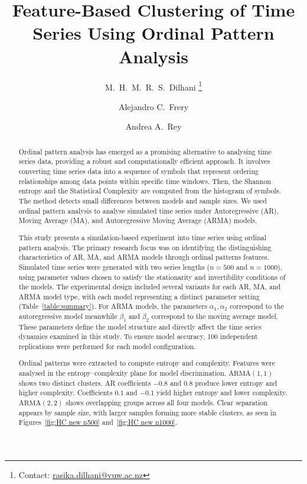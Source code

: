 \documentclass[11pt,a4paper]{article}
\title{\vspace{-1cm}Feature-Based Clustering of Time Series Using Ordinal Pattern Analysis\vspace{-0.3cm}}
\author[1]{M.\ H.\ M.\ R.\ S.\ Dilhani \thanks{Contact: \href{mailto:rasika.dilhani@vuw.ac.nz}{rasika.dilhani@vuw.ac.nz}}}
\author[1]{Alejandro C.\ Frery}
\author[2]{Andrea A.\ Rey}
\affil[1]{School of Mathematics and Statistics, Victoria University of Wellington, New Zealand}
\affil[2]{Laboratorio de Investigación y Desarrollo Experimental en Computación (LIDEC), Universidad Nacional de Hurlingham (UNAHUR), Argentina}
\date{}
\begin{document}
	\maketitle
	\vspace{-0.5cm}
	
	\begin{abstract}
	
	
Ordinal pattern analysis has emerged as a promising alternative to analysing time series data, providing a robust and computationally efficient approach. 
It involves converting time series data into a sequence of symbols that represent ordering relationships among data points within specific time windows.  
Then, the Shannon entropy and the Statistical Complexity are computed from the histogram of symbols. 
The method detects small differences between models and sample sizes.
We used ordinal pattern analysis to analyse simulated time series under Autoregressive (AR), Moving Average (MA), and Autoregressive Moving Average (ARMA) models. 
	
This study presents a simulation-based experiment into time series using ordinal pattern analysis. 
The primary research focus was on identifying the distinguishing characteristics of AR, MA, and ARMA models through ordinal patterns features. 
Simulated time series were generated with two series lengths ($n = 500$ and $n = 1000$), using parameter values chosen to satisfy the stationarity and invertibility conditions of the models. 
The experimental design included several variants for each AR, MA, and ARMA model type, with each model representing a distinct parameter setting (Table~\ref{table:summary}). 
For ARMA models, the parameters $\alpha_1, \alpha_2$ correspond to the autoregressive model meanwhile $\beta_1$ and $\beta_2$ correspond to the moving average model.
These parameters define the model structure and directly affect the time series dynamics examined in this study. 
To ensure model accuracy, 100 independent replications were performed for each model configuration.

Ordinal patterns were extracted to compute entropy and complexity. 
Features were analysed in the entropy–complexity plane for model discrimination. 
$\mathrm{ARMA}(1,1)$ shows two distinct clusters.
AR coefficients $-0.8$ and $0.8$ produce lower entropy and higher complexity. 
Coefficients $0.1$ and $-0.1$ yield higher entropy and lower complexity. 
$\mathrm{ARMA}(2,2)$ shows overlapping groups across all four models. 
Clear separation appears by sample size, with larger samples forming more stable clusters, as seen in Figures~\ref{fig:HC new n500} and~\ref{fig:HC new n1000}.


\end{abstract}
\end{document}
